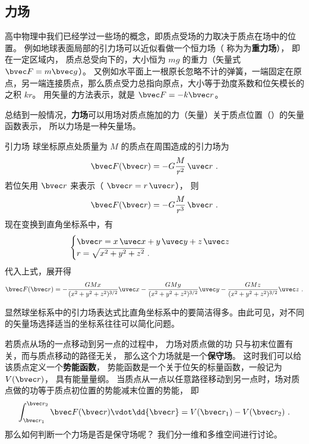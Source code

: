 

\subsection{力场}
高中物理中我们已经学过一些场的概念，即质点受场的力取决于质点在场中的位置。 例如地球表面局部的引力场可以近似看做一个恒力场（ 称为为\textbf{重力场}）， 即在一定区域内， 质点总受向下的，大小恒为 $mg$ 的重力（矢量式 $\bvec F = m\bvec g$）。 又例如水平面上一根原长忽略不计的弹簧，一端固定在原点，另一端连接质点，那么质点受力总指向原点，大小等于劲度系数和位矢模长的之积 $kr$。 用矢量的方法表示，就是 $\bvec F = -k\bvec r$。

总结到一般情况，\textbf{力场}可以用场对质点施加的力（矢量）关于质点位置（）的矢量函数表示， 所以力场是一种矢量场。


\begin{example}{引力场}\label{ex_V_1}
球坐标原点处质量为 $M$ 的质点在周围造成的引力场为
\begin{equation}
\bvec F(\bvec r) =  - G\frac{M}{r^2}\,\uvec r~.
\end{equation} 
若位矢用 $\bvec r$ 来表示（ $\bvec r = r\,\uvec r$）， 则
\begin{equation}
\bvec F(\bvec r) =  - G\frac{M}{r^3}\,\bvec r~.
\end{equation}
现在变换到直角坐标系中，有
\begin{equation}
\begin{cases}
\bvec r = x\,\uvec x + y\,\uvec y + z\,\uvec z\\
r = \sqrt{x^2 + y^2 + z^2} ~.
\end{cases}
\end{equation} 
代入上式，展开得
\begin{equation}
\bvec F(\bvec r) =  - \frac{GMx}{(x^2+y^2+z^2)^{3/2}}\uvec x - \frac{GMy}{(x^2 +y^2+z^2)^{3/2}}\uvec y - \frac{GMz}{(x^2+y^2+z^2)^{3/2}}\uvec z ~.
\end{equation} 

显然球坐标系中的引力场表达式比直角坐标系中的要简洁得多。由此可见，对不同的矢量场选择适当的坐标系往往可以简化问题。
\end{example}

若质点从场的一点移动到另一点的过程中， 力场对质点做的功 只与初末位置有关，而与质点移动的路径无关， 那么这个力场就是一个\textbf{保守场}。 这时我们可以给该质点定义一个\textbf{势能函数}， 势能函数是一个关于位矢的标量函数，一般记为 $V(\bvec r)$， 具有能量量纲。 当质点从一点以任意路径移动到另一点时，场对质点做的功等于质点初位置的势能减末位置的势能， 即
\begin{equation}\label{eq_V_1}
\int_{\bvec r_1}^{\bvec r_2} \bvec F(\bvec r) \vdot \dd{\bvec r} = V(\bvec r_1)-V(\bvec r_2)~.
\end{equation}
那么如何判断一个力场是否是保守场呢？ 我们分一维和多维空间进行讨论。

